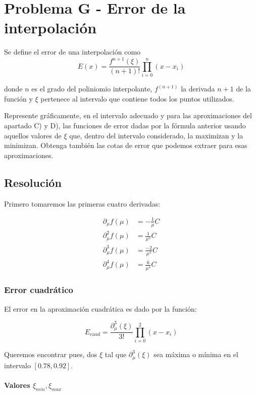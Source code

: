 \section{Problema G - Error de la interpolación}\label{sec:interp_err}

Se define el error de una interpolación como
$$E(x) = \frac{ f^{n+1}(\xi) }{ (n+1)! } \prod_{i=0}^{n}(x - x_i) $$

donde $n$ es el grado del poliniomio interpolante, $f^{(n+1)}$ la derivada $n+1$ de la función y $\xi$ pertenece al intervalo que contiene todos los puntos utilizados. 

Represente gráficamente, en el intervalo adecuado y para las aproximaciones del apartado C) y D), las funciones de error dadas por la fórmula anterior usando aquellos valores
de $\xi$ que, dentro del intervalo considerado, la maximizan y la minimizan. Obtenga también las cotas de error que podemos extraer para esas aproximaciones.

\subsection{Resolución}

Primero tomaremos las primeras cuatro derivadas:

\begin{align}
	\partial_{\mu} f(\mu)
	&= - \frac{1}{\mu} C  \\
	\partial_{\mu}^{2} f(\mu)
	&= \frac{1}{\mu^2} C \\
	\partial_{\mu}^{3} f(\mu)
	&= \frac{-2}{\mu^3} C \\
	\partial_{\mu}^{4} f(\mu)
	&= \frac{6}{\mu^4} C	
\end{align}
\newpage

\subsubsection{Error cuadrático}

El error en la aproximación cuadrática es dado por la función:

$$ E_{cuad} = \frac{ \partial_{\mu}^3(\xi) }{3!} \prod_{i=0}^{2} (x - x_i) $$

Queremos encontrar pues, dos $\xi$ tal que $\partial_{\mu}^3(\xi)$ sea máxima o mínima en el intervalo $[0.78, 0.92]$.

\paragraph{Valores $\xi_{min}, \xi_{max}$}

